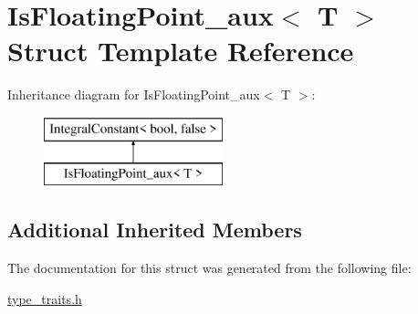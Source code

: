\hypertarget{struct_is_floating_point__aux}{}\section{Is\+Floating\+Point\+\_\+aux$<$ T $>$ Struct Template Reference}
\label{struct_is_floating_point__aux}
Inheritance diagram for Is\+Floating\+Point\+\_\+aux$<$ T $>$\+:\begin{figure}[H]
\begin{center}
\leavevmode
\includegraphics[height=2.000000cm]{struct_is_floating_point__aux}
\end{center}
\end{figure}
\subsection*{Additional Inherited Members}


The documentation for this struct was generated from the following file\+:\begin{DoxyCompactItemize}
\item 
\hyperlink{type__traits_8h}{type\+\_\+traits.\+h}\end{DoxyCompactItemize}
